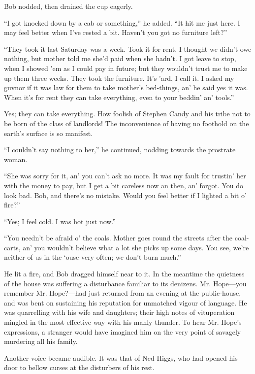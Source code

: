 Bob nodded, then drained the cup eagerly.

``I got knocked down by a cab or something,'' he added. ``It hit me just
here. I may feel better when I've rested a bit. Haven't you got no
furniture left?''

``They took it last Saturday was a week. Took it for rent. I thought we
didn't owe nothing, but mother told me she'd paid when she hadn't. I got
leave to stop, when I showed 'em as I could pay in future; but they
wouldn't trust me to make up them three weeks. They took the furniture.
It's 'ard, I call it. I asked my guvnor if it was law for them to take
mother's bed-things, an' he said yes it was. When it's for rent they can
take everything, even to your beddin' an' tools.''

Yes; they can take everything. How foolish of Stephen Candy and his
tribe not to be born of the class of landlords! The inconvenience of
having no foothold on the earth's surface is so manifest.

{}``I couldn't say nothing to her,'' he continued, nodding towards the
prostrate woman.

``She was sorry for it, an' you can't ask no more. It was my fault for
trustin' her with the money to pay, but I get a bit careless now an
then, an' forgot. You do look bad. Bob, and there's no mistake. Would
you feel better if I lighted a bit o' fire?''

``Yes; I feel cold. I was hot just now.''

``You needn't be afraid o' the coals. Mother goes round the streets
after the coal-carts, an' you wouldn't believe what a lot she picks up
some days. You see, we're neither of us in the `ouse very often; we
don't burn much.''

He lit a fire, and Bob dragged himself near to it. In the meantime the
quietness of the house was suffering a disturbance familiar to its
denizens. Mr. Hope---you remember Mr. Hope?---had just returned from an
evening at the public-house, and was bent on sustaining his reputation
for unmatched vigour of language. He was quarrelling with his wife and
daughters; their high notes of vituperation mingled in the most
effective way with his manly thunder. To hear Mr. Hope's expressions, a
stranger would have imagined him on {}the very point of savagely
murdering all his family.

Another voice became audible. It was that of Ned Higgs, who had opened
his door to bellow curses at the disturbers of his rest.

